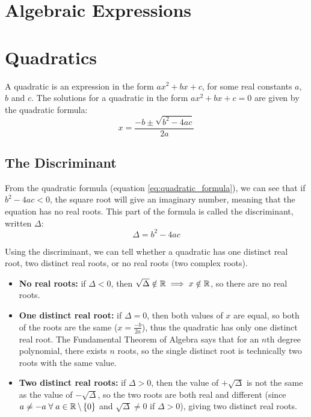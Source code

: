 \section{Algebraic Expressions} \label{algebraic_expessions}

    \newpage

\section{Quadratics} \label{quadratics}
    A quadratic is an expression in the form $ax^2+bx+c$, for some real constants $a$, $b$ and $c$.
    The solutions for a quadratic in the form $ax^2+bx+c=0$ are given by the quadratic formula:
    \begin{equation} \label{eq:quadratic_formula}
        x=\frac{-b\pm\sqrt{b^2-4ac}}{2a}
    \end{equation}
    
    \subsection{The Discriminant}
        From the quadratic formula (equation \ref{eq:quadratic_formula}), we can see that if $b^2-4ac<0$, the square root will give an imaginary number, meaning that the equation has no real roots.
        This part of the formula is called the discriminant, written $\Delta$:
        \begin{equation}
            \Delta=b^2-4ac
        \end{equation}

        Using the discriminant, we can tell whether a quadratic has one distinct real root, two distinct real roots, or no real roots (two complex roots).
        \begin{itemize}
            \item \textbf{No real roots:} if $\Delta<0$, then $\sqrt{\Delta}\notin\operatorname{\mathbb{R}}\implies x\notin\operatorname{\mathbb{R}}$, so there are no real roots.
            \item \textbf{One distinct real root:} if $\Delta=0$, then both values of $x$ are equal, so both of the roots are the same ($x=\frac{-b}{2a}$), thus the quadratic has only one distinct real root.
            The Fundamental Theorem of Algebra says that for an $n$th degree polynomial, there exists $n$ roots, so the single distinct root is technically two roots with the same value.
            \item \textbf{Two distinct real roots:} if $\Delta>0$, then the value of $+\sqrt{\Delta}$ is not the same as the value of $-\sqrt{\Delta}$, so the two roots are both real and different (since $a\neq-a\;\forall\;a\in\operatorname{\mathbb{R}}\setminus\left\{0\right\}$ and $\sqrt{\Delta}\neq0$ if $\Delta>0$), giving two distinct real roots.
        \end{itemize}

